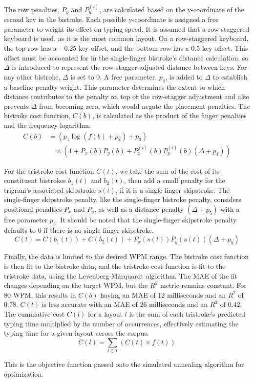 The row penalties, $P_y$ and $P^{(i)}_y$, are calculated based on the y-coordinate of the second key in the bistroke. Each possible y-coordinate is assigned a free parameter to weight its effect on typing speed. It is assumed that a row-staggered keyboard is used, as it is the most common layout. On a row-staggered keyboard, the top row has a $-0.25$ key offset, and the bottom row has a $0.5$ key offset. This offset must be accounted for in the single-finger bistroke's distance calculation, so $\Delta$ is introduced to represent the row-stagger-adjusted distance between keys. For any other bistroke, $\Delta$ is set to $0$. A free parameter, $p_4$, is added to $\Delta$ to establish a baseline penalty weight. This parameter determines the extent to which distance contributes to the penalty on top of the row-stagger adjustment and also prevents $\Delta$ from becoming zero, which would negate the placement penalties. The bistroke cost function, $C(b)$, is calculated as the product of the finger penalties and the frequency logarithm.
\begin{equation*}
    \begin{split}
        C(b) &= \left(p_1 \log (f(b) + p_2) + p_3\right) \\
             &\quad \times \left(1 + P_x(b) P_y(b) + P^{(i)}_x(b) P^{(i)}_y(b) (\Delta + p_4) \right)  
    \end{split}
\end{equation*}

\noindent For the tristroke cost function $C(t)$, we take the sum of the cost of its constituent bistrokes $b_1(t)$ and $b_2(t)$, then add a small penalty for the trigram's associated skipstroke $s(t)$, if it is a single-finger skipstroke. The single-finger skipstroke penalty, like the single-finger bistroke penalty, considers positional penalties $P_x$ and $P_y$, as well as a distance penalty $(\Delta + p_5)$ with a free parameter $p_5$. It should be noted that the single-finger skipstroke penalty defaults to $0$ if there is no single-finger skipstroke.  %
\begin{equation*}
C(t) = C(b_1(t)) + C(b_2(t)) + P_x(s(t))  P_y(s(t)) (\Delta + p_5)
\end{equation*}

\noindent Finally, the data is limited to the desired WPM range. The bistroke cost function is then fit to the bistroke data, and the tristroke cost function is fit to the tristroke data, using the Levenberg-Marquardt algorithm. The MAE of the fit changes depending on the target WPM, but the $R^2$ metric remains constant. For $80$ WPM, this results in $C(b)$ having an MAE of $12$ milliseconds and an $R^2$ of $0.78$. $C(t)$ is less accurate with an MAE of $26$ milliseconds and an $R^2$ of $0.42$. The cumulative cost $C(l)$ for a layout $l$ is the sum of each tristroke's predicted typing time multiplied by its number of occurrences, effectively estimating the typing time for a given layout across the corpus.
\begin{equation*}
C(l) = \sum_{t \in T} (C(t) \times f(t) )
\end{equation*}

\noindent This is the objective function passed onto the simulated annealing algorithm for optimization.



